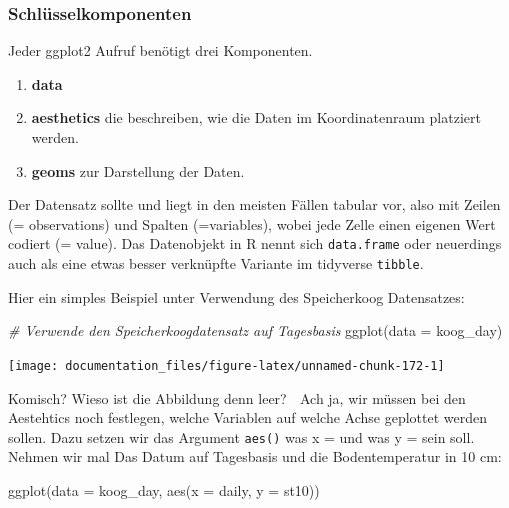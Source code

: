 \documentclass[
]{article}
\newenvironment{Shaded}{\begin{snugshade}}{\end{snugshade}}
\newcommand{\AttributeTok}[1]{\textcolor[rgb]{0.77,0.63,0.00}{#1}}
\newcommand{\CommentTok}[1]{\textcolor[rgb]{0.56,0.35,0.01}{\textit{#1}}}
\newcommand{\FunctionTok}[1]{\textcolor[rgb]{0.00,0.00,0.00}{#1}}
\newcommand{\NormalTok}[1]{#1}
\providecommand{\tightlist}{%
  \setlength{\itemsep}{0pt}\setlength{\parskip}{0pt}}
\begin{document}
\hypertarget{schluxfcsselkomponenten}{%
\subsubsection{Schlüsselkomponenten}\label{schluxfcsselkomponenten}}

Jeder ggplot2 Aufruf benötigt drei Komponenten.

\begin{enumerate}
\def\labelenumi{\arabic{enumi}.}
\tightlist
\item
  \textbf{data}
\item
  \textbf{aesthetics} die beschreiben, wie die Daten im Koordinatenraum platziert werden.
\item
  \textbf{geoms} zur Darstellung der Daten.
\end{enumerate}

Der Datensatz sollte und liegt in den meisten Fällen tabular vor, also mit Zeilen (= observations) und Spalten (=variables), wobei jede Zelle einen eigenen Wert codiert (= value). Das Datenobjekt in R nennt sich \texttt{data.frame} oder neuerdings auch als eine etwas besser verknüpfte Variante im tidyverse \texttt{tibble}.

Hier ein simples Beispiel unter Verwendung des Speicherkoog Datensatzes:

\begin{Shaded}
\begin{Highlighting}[]
\CommentTok{\# Verwende den Speicherkoogdatensatz auf Tagesbasis}
\FunctionTok{ggplot}\NormalTok{(}\AttributeTok{data =}\NormalTok{ koog\_day)}
\end{Highlighting}
\end{Shaded}

\begin{center}\texttt{[image: documentation\_files/figure-latex/unnamed-chunk-172-1]} \end{center}

Komisch? Wieso ist die Abbildung denn leer? 🤯 Ach ja, wir müssen bei den Aestehtics noch festlegen, welche Variablen auf welche Achse geplottet werden sollen. Dazu setzen wir das Argument \texttt{aes()} was x = und was y = sein soll. Nehmen wir mal Das Datum auf Tagesbasis und die Bodentemperatur in 10 cm:

\begin{Shaded}
\begin{Highlighting}[]
\FunctionTok{ggplot}\NormalTok{(}\AttributeTok{data =}\NormalTok{ koog\_day, }\FunctionTok{aes}\NormalTok{(}\AttributeTok{x =}\NormalTok{ daily, }\AttributeTok{y =}\NormalTok{ st10))}
\end{Highlighting}
\end{Shaded}
\end{document}
